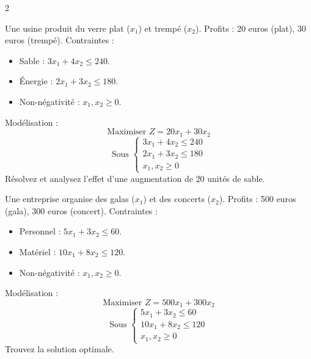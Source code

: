 \begin{multicols}{2}
\begin{exercice}
	Une usine produit du verre plat (\(x_1\)) et trempé (\(x_2\)). Profits : 20 euros (plat), 30 euros (trempé). Contraintes :
	\begin{itemize}
		\item Sable : \(3x_1 + 4x_2 \leq 240\).
		\item Énergie : \(2x_1 + 3x_2 \leq 180\).
		\item Non-négativité : \(x_1, x_2 \geq 0\).
	\end{itemize}
	Modélisation :
	\[
	\text{Maximiser } Z = 20x_1 + 30x_2
	\]
	\[
	\text{Sous } \begin{cases}
	3x_1 + 4x_2 \leq 240 \\
	2x_1 + 3x_2 \leq 180 \\
	x_1, x_2 \geq 0
	\end{cases}
	\]
	Résolvez et analysez l'effet d'une augmentation de 20 unités de sable.
\end{exercice}

\begin{exercice}
	Une entreprise organise des galas (\(x_1\)) et des concerts (\(x_2\)). Profits : 500 euros (gala), 300 euros (concert). Contraintes :
	\begin{itemize}
		\item Personnel : \(5x_1 + 3x_2 \leq 60\).
		\item Matériel : \(10x_1 + 8x_2 \leq 120\).
		\item Non-négativité : \(x_1, x_2 \geq 0\).
	\end{itemize}
	Modélisation :
	\[
	\text{Maximiser } Z = 500x_1 + 300x_2
	\]
	\[
	\text{Sous } \begin{cases}
	5x_1 + 3x_2 \leq 60 \\
	10x_1 + 8x_2 \leq 120 \\
	x_1, x_2 \geq 0
	\end{cases}
	\]
	Trouvez la solution optimale.
\end{exercice}


\end{multicols}
